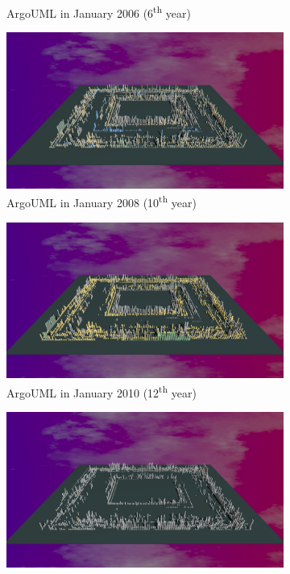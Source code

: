 \begin{figure}[ht]
\begin{subfigure}{0.48\textwidth}
        \caption{ArgoUML in January 2006 (6\textsuperscript{th} year)} 
        \label{fig:ArgoUML_V3_S3}
    \end{subfigure}\hspace*{\fill}
    \begin{subfigure}{0.48\textwidth}
        \includegraphics[width=\linewidth]{ArgoUML/Animation010.png}
        \caption{ArgoUML in January 2008 (10\textsuperscript{th} year)} 
        \label{fig:ArgoUML_V3_S4}
    \end{subfigure}
    \medskip
    \begin{subfigure}{0.48\textwidth}
        \includegraphics[width=\linewidth]{ArgoUML/Animation012.png}
        \caption{ArgoUML in January 2010 (12\textsuperscript{th} year)} 
        \label{fig:ArgoUML_V3_S5}
    \end{subfigure}\hspace*{\fill}
    \begin{subfigure}{0.48\textwidth}
        \includegraphics[width=\linewidth]{ArgoUML/Animation022.png}

\end{subfigure}
\end{figure}
